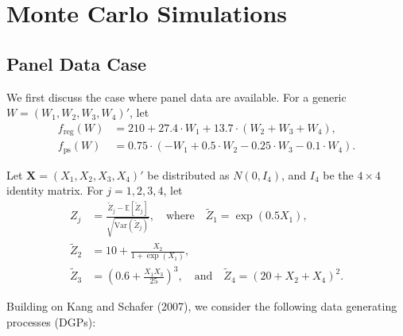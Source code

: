 \section{Monte Carlo Simulations}


\subsection*{Panel Data Case}
We first discuss the case where panel data are available. For a generic $W = (W_1, W_2, W_3, W_4)'$, let
\begin{align*}
    f_{\text{reg}}(W) &= 210 + 27.4 \cdot W_1 + 13.7 \cdot (W_2 + W_3 + W_4), \\
    f_{\text{ps}}(W) &= 0.75 \cdot (-W_1 + 0.5 \cdot W_2 - 0.25 \cdot W_3 - 0.1 \cdot W_4).
\end{align*}

Let $\mathbf{X} = (X_1, X_2, X_3, X_4)'$ be distributed as $N(0, I_4)$, and $I_4$ be the $4 \times 4$ identity matrix. For $j = 1, 2, 3, 4$, let
\begin{align*}
    Z_j &= \frac{\tilde{Z}_j - \mathbb{E}[\tilde{Z}_j]}{\sqrt{\text{Var}(\tilde{Z}_j)}}, \quad \text{where} \quad \tilde{Z}_1 = \exp(0.5X_1), \\
    \tilde{Z}_2 &= 10 + \frac{X_2}{1 + \exp(X_1)}, \\
    \tilde{Z}_3 &= (0.6 + \frac{X_1 X_3}{25})^3, \quad \text{and} \quad \tilde{Z}_4 = (20 + X_2 + X_4)^2.
\end{align*}

Building on Kang and Schafer (2007), we consider the following data generating processes (DGPs):

